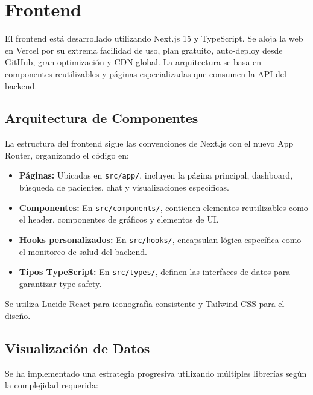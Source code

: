 \newpage
\section{Frontend}


El frontend está desarrollado utilizando Next.js 15 y TypeScript. Se aloja la web en Vercel por su extrema facilidad de uso, plan gratuito, auto-deploy desde GitHub, gran optimización y CDN global. La arquitectura se basa en componentes reutilizables y páginas especializadas que consumen la API del backend.



\subsection{Arquitectura de Componentes}

La estructura del frontend sigue las convenciones de Next.js con el nuevo App Router, organizando el código en:

\begin{itemize}
\item \textbf{Páginas:} Ubicadas en \texttt{src/app/}, incluyen la página principal, dashboard, búsqueda de pacientes, chat y visualizaciones específicas.
\item \textbf{Componentes:} En \texttt{src/components/}, contienen elementos reutilizables como el header, componentes de gráficos y elementos de UI.
\item \textbf{Hooks personalizados:} En \texttt{src/hooks/}, encapsulan lógica específica como el monitoreo de salud del backend.
\item \textbf{Tipos TypeScript:} En \texttt{src/types/}, definen las interfaces de datos para garantizar type safety.
\end{itemize}

Se utiliza Lucide React para iconografía consistente y Tailwind CSS para el diseño.

\subsection{Visualización de Datos}

Se ha implementado una estrategia progresiva utilizando múltiples librerías según la complejidad requerida:

